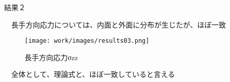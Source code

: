 \begin{frame}{結果２}
 
　長手方向応力については、内面と外面に分布が生じたが、ほぼ一致
\begin{figure}[htbp]
\centering
  \begin{minipage}{0.49\columnwidth}
     \centering
     \texttt{[image: work/images/results03.png]}
     \caption{長手方向応力σzz}
  \end{minipage}
%
  \begin{minipage}{0.49\columnwidth}
  \end{minipage}
\end{figure}

　全体として、理論式と、ほぼ一致していると言える

\end{frame}
